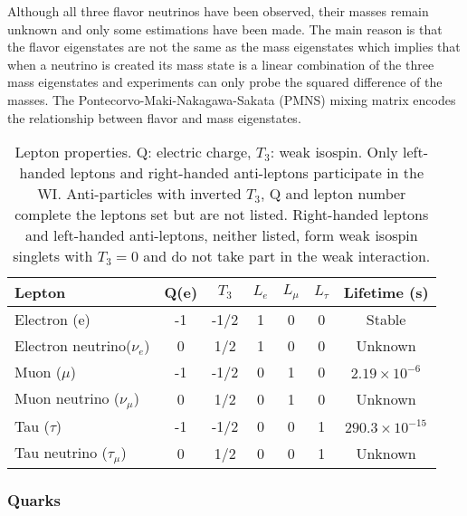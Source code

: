 Although all three flavor neutrinos have been observed, their masses remain unknown and only some estimations have been made\cite{nu_mass}. The main reason is that the flavor eigenstates are not the same as the mass eigenstates which implies that when a neutrino is created its mass state is a linear combination of the three mass eigenstates and experiments can only probe the squared difference of the masses. The Pontecorvo-Maki-Nakagawa-Sakata (PMNS) mixing matrix encodes the relationship between flavor and mass eigenstates.
\begin{center}
\begin{table}[h]
\centering
\footnotesize
\begin{tabular}{lcccccc} \hline
Lepton                      & Q(e) & $T_3$&$L_e$ & $L_\mu$ & $L_\tau$ & Lifetime (s)                \\ \hline
Electron (e)                & -1   & -1/2 & 1    & 0       & 0        & Stable                      \\ %
Electron neutrino($\nu_e$)  & 0    &  1/2 & 1    & 0       & 0        & Unknown                     \\ %
Muon ($\mu$)                & -1   & -1/2 & 0    & 1       & 0        & $2.19\times10^{-6}$\\ %
Muon neutrino ($\nu_\mu$)   & 0    &  1/2 & 0    & 1       & 0        & Unknown                     \\ %
Tau ($\tau$)                & -1   & -1/2 & 0    & 0       & 1        & $290.3\times10^{-15}$    \\ %
Tau neutrino ($\tau_\mu$)   & 0    &  1/2 & 0    & 0       & 1        & Unknown                     \\ \hline
\end{tabular}
\caption[Lepton properties.]{Lepton properties\cite{pdg}. Q: electric charge, $T_3$: weak isospin. Only left-handed leptons and right-handed anti-leptons participate in the WI. Anti-particles with inverted $T_3$, Q and lepton number complete the leptons set but are not listed. Right-handed leptons and left-handed anti-leptons, neither listed, form weak isospin singlets with $T_3=0$ and do not take part in the weak interaction.}\label{leptons}
\end{table}
\end{center}

\subsubsection*{Quarks}

